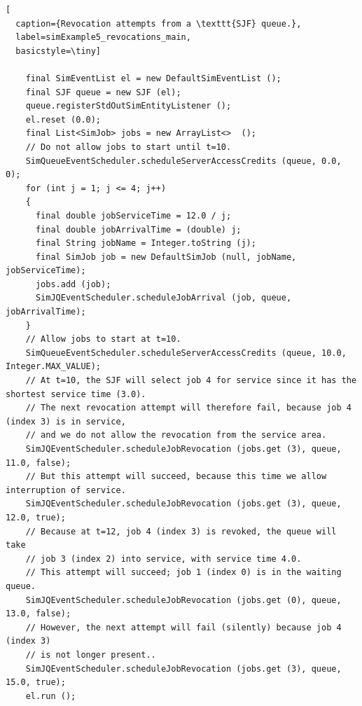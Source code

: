 \documentclass[12pt]{book}
\begin{document}
\begin{lstfloat}
\begin{lstlisting}[
  caption={Revocation attempts from a \texttt{SJF} queue.},
  label=simExample5_revocations_main,
  basicstyle=\tiny]

    final SimEventList el = new DefaultSimEventList ();
    final SJF queue = new SJF (el);
    queue.registerStdOutSimEntityListener ();
    el.reset (0.0);
    final List<SimJob> jobs = new ArrayList<>  ();
    // Do not allow jobs to start until t=10.
    SimQueueEventScheduler.scheduleServerAccessCredits (queue, 0.0, 0);
    for (int j = 1; j <= 4; j++)
    {
      final double jobServiceTime = 12.0 / j;
      final double jobArrivalTime = (double) j;
      final String jobName = Integer.toString (j);
      final SimJob job = new DefaultSimJob (null, jobName, jobServiceTime);
      jobs.add (job);
      SimJQEventScheduler.scheduleJobArrival (job, queue, jobArrivalTime);
    }
    // Allow jobs to start at t=10.
    SimQueueEventScheduler.scheduleServerAccessCredits (queue, 10.0, Integer.MAX_VALUE);
    // At t=10, the SJF will select job 4 for service since it has the shortest service time (3.0).
    // The next revocation attempt will therefore fail, because job 4 (index 3) is in service,
    // and we do not allow the revocation from the service area.
    SimJQEventScheduler.scheduleJobRevocation (jobs.get (3), queue, 11.0, false);
    // But this attempt will succeed, because this time we allow interruption of service.
    SimJQEventScheduler.scheduleJobRevocation (jobs.get (3), queue, 12.0, true);
    // Because at t=12, job 4 (index 3) is revoked, the queue will take
    // job 3 (index 2) into service, with service time 4.0.
    // This attempt will succeed; job 1 (index 0) is in the waiting queue.
    SimJQEventScheduler.scheduleJobRevocation (jobs.get (0), queue, 13.0, false);
    // However, the next attempt will fail (silently) because job 4 (index 3)
    // is not longer present..
    SimJQEventScheduler.scheduleJobRevocation (jobs.get (3), queue, 15.0, true);
    el.run ();

\end{lstlisting}
\end{lstfloat}
  
\end{document}
